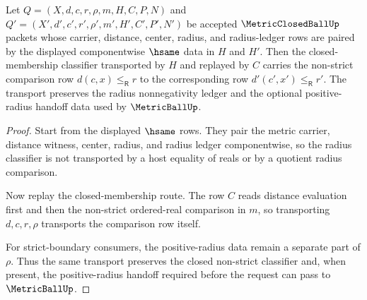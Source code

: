 \begin{theorem}
\label{thm:metricclosedball-radius-classifier-stability}
Let $Q=(X,d,c,r,\rho,m,H,C,P,N)$ and $Q'=(X',d',c',r',\rho',m',H',C',P',N')$ be accepted $\MetricClosedBallUp$ packets whose carrier, distance, center, radius, and radius-ledger rows are paired by the displayed componentwise $\hsame$ data in $H$ and $H'$. Then the closed-membership classifier transported by $H$ and replayed by $C$ carries the non-strict comparison row $d(c,x)\leq_{\mathsf R}r$ to the corresponding row $d'(c',x')\leq_{\mathsf R}r'$. The transport preserves the radius nonnegativity ledger and the optional positive-radius handoff data used by $\MetricBallUp$.
\end{theorem}
\begin{proof}
Start from the displayed $\hsame$ rows. They pair the metric carrier, distance witness, center, radius, and radius ledger componentwise, so the radius classifier is not transported by a host equality of reals or by a quotient radius comparison.

Now replay the closed-membership route. The row $C$ reads distance evaluation first and then the non-strict ordered-real comparison in $m$, so transporting $d,c,r,\rho$ transports the comparison row itself.

For strict-boundary consumers, the positive-radius data remain a separate part of $\rho$. Thus the same transport preserves the closed non-strict classifier and, when present, the positive-radius handoff required before the request can pass to $\MetricBallUp$.
\end{proof}

